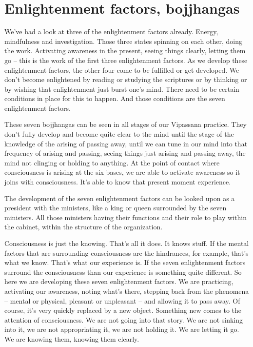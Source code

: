 \documentclass[letterpaper,10pt,english]{sphinxmanual}
\begin{document}
\section{Enlightenment factors, bojjhangas}
\label{\detokenize{6-a:enlightenment-factors-bojjhangas}}
\sphinxAtStartPar
We’ve had a look at three of the enlightenment factors already. Energy,
mindfulness  and  investigation.  Those  three  states  spinning  on  each  other,
doing the work. Activating awareness in the present, seeing things clearly,
letting them go – this is the work of the first three enlightenment factors. As
we develop these enlightenment factors, the other four come to be fulfilled
or get developed. We don’t become enlightened by reading or studying the
scriptures or by thinking or by wishing that enlightenment just burst one’s
mind. There need to be certain conditions in place for this to happen. And
those conditions are the seven enlightenment factors.

\sphinxAtStartPar
These seven bojjhangas can be seen in all stages of our Vipassana practice. They don’t fully develop and become quite clear to the mind until the
stage of the knowledge of the arising of passing away, until we can tune in
our mind into that frequency of arising and passing, seeing things just arising and passing away, the mind not clinging or holding to anything. At the
point of contact where consciousness is arising at the six bases, we are able
to activate awareness so it joins with consciousness. It’s able to know that
  present moment experience.

\sphinxAtStartPar
The  development  of  the  seven  enlightenment  factors  can  be  looked
upon as a president with the ministers, like a king or queen surrounded by
the seven ministers. All those ministers having their functions and their role
to play within the cabinet, within the structure of the organization.

\sphinxAtStartPar
Consciousness is just the knowing. That’s all it does. It knows stuff. If
the mental factors that are surrounding consciousness are the hindrances, for
example, that’s what we know. That’s what our experience is. If the seven
enlightenment  factors  surround  the  consciousness  than  our  experience  is
something  quite  different.  So  here  we  are  developing  these  seven  enlightenment factors. We are practicing, activating our awareness, noting what’s
there,  stepping  back  from  the  phenomena  –  mental  or  physical,  pleasant
or  unpleasant  –  and  allowing  it  to  pass  away.  Of  course,  it’s  very  quickly
replaced  by  a  new  object.  Something  new  comes  to  the  attention  of  consciousness. We are not going into that story. We are not sinking into it, we
are not appropriating it, we are not holding it. We are letting it go. We are
knowing them, knowing them clearly.
\end{document}
